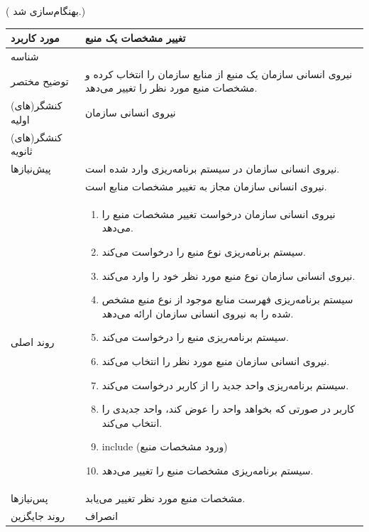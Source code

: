 \newpage
({\color{red} بهنگام‌سازی شد.})
\begin{table}[H]
	\centering
	\begin{tabular}{|p{3cm}|p{10cm}|}
		\hline
		
		مورد کاربرد	& تغییر مشخصات یک منبع  \\
		\hline
		
		شناسه & 
		\stepcounter{usecase_ID}
		
		\arabic{usecase_ID} \\
		
		\hline
		
		توضیح مختصر & نیروی انسانی سازمان یک منبع از منابع سازمان را انتخاب کرده و مشخصات منبع مورد نظر را تغییر می‌دهد. \\
		\hline
		
		کنشگر(های) اولیه& نیروی انسانی سازمان  \\
		\hline
		
		کنشگر(های) ثانویه&  \\
		\hline
		
		پیش‌نیازها &
		نیروی انسانی سازمان در سیستم برنامه‌ریزی وارد شده است.\\
		& نیروی انسانی سازمان مجاز به تغییر مشخصات منابع است. \\
		\hline
		
		
		روند اصلی &
		\begin{enumerate}[topsep=0cm,leftmargin=0.5cm]
			\item نیروی انسانی سازمان  درخواست تغییر مشخصات منبع را می‌دهد.
			\item سیستم برنامه‌ریزی نوع منبع را درخواست می‌کند.
			\item نیروی انسانی سازمان  نوع منبع مورد نظر خود را وارد می‌کند.
			\item سیستم برنامه‌ریزی فهرست منابع موجود از نوع منبع مشخص شده را به نیروی انسانی سازمان ارائه می‌دهد.
			\item سیستم برنامه‌ریزی منبع را درخواست می‌کند.
			\item نیروی انسانی سازمان منبع مورد نظر را انتخاب می‌کند.
			\item سیستم برنامه‌ریزی واحد جدید را از کاربر درخواست می‌کند.
			\item کاربر در صورتی که بخواهد واحد را عوض کند، واحد جدیدی را انتخاب می‌کند.
			\item include (ورود مشخصات منبع)
			\item سیستم برنامه‌ریزی مشخصات منبع را تغییر می‌دهد.
		\end{enumerate} \\
		\hline
		
		پس‌نیازها &
		مشخصات منبع مورد نظر تغییر می‌یابد. \\
		
		\hline
		روند جایگزین
		& انصراف \\
		\hline
		
	\end{tabular}
\end{table}

